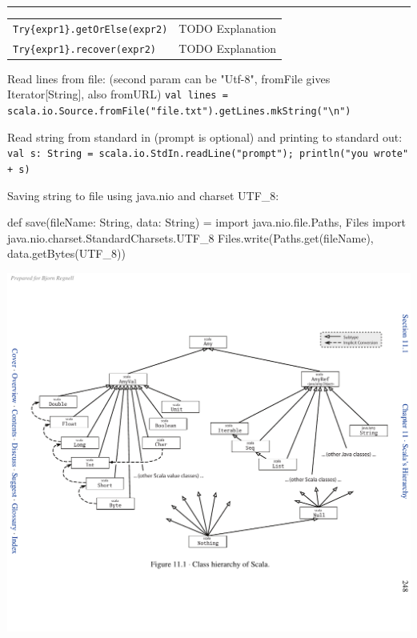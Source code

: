 \documentclass[article, a5paper]{memoir}
\newcommand{\LangColor}{red}
\newcommand{\head}[1]{{\bfseries {\color{\LangColor}{#1}}\par\vspace{1mm}\hrule\vspace{-2mm}}}
\renewcommand{\arraystretch}{0.9}
\newcommand{\code}{\lstinline[basicstyle=\ttfamily]}
\newcommand{\Newline}{\vspace{\baselineskip}}
\begin{document}
\head{scala.util.Try}\Newline
{\small\renewcommand{\arraystretch}{1.1}
\begin{tabular}{@{}l l}
\code|Try{expr1}.getOrElse(expr2)| & TODO Explanation \\
\code|Try{expr1}.recover(expr2)| & TODO Explanation \\
\end{tabular}
}


\Newline\head{Reading/writing from file and standard in/out:}\Newline
{\small
Read lines from file: (second param can be "Utf-8", fromFile gives Iterator[String], also fromURL)
\code|val lines = scala.io.Source.fromFile("file.txt").getLines.mkString("\n")| 
}


{\small
\vspace{0.5em}Read string from standard in (prompt is optional) and printing to standard out:
\code|val s: String = scala.io.StdIn.readLine("prompt"); println("you wrote" + s)|

\vspace{0.5em}Saving string to file using java.nio and charset UTF\_8:\vspace{-0.5em}
\begin{Code}
def save(fileName: String, data: String) = {
    import java.nio.file.{Paths, Files}
    import java.nio.charset.StandardCharsets.UTF_8
    Files.write(Paths.get(fileName), data.getBytes(UTF_8))
}
\end{Code}
}

\clearpage
\Newline\head{The Scala Type System}%

\includegraphics[width=1.07\textwidth,trim=12mm 0 0 0cm]{../img/hierarchy.pdf}
\end{document}
